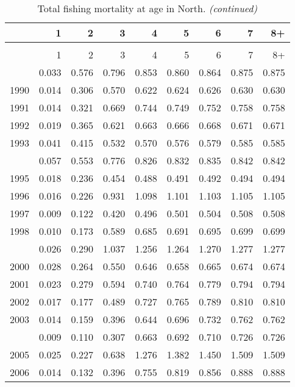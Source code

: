 \documentclass[
]{article}
\begin{document}
\begin{longtable}[t]{lrrrrrrrr}
\caption{\label{tab:North-region-FAA-table}Total fishing mortality at age in North.}\\
\toprule
  & 1 & 2 & 3 & 4 & 5 & 6 & 7 & 8+\\
\midrule
\endfirsthead
\caption[]{Total fishing mortality at age in North. \textit{(continued)}}\\
\toprule
  & 1 & 2 & 3 & 4 & 5 & 6 & 7 & 8+\\
\midrule
\endhead

\endfoot
\bottomrule
\endlastfoot
1989 & 0.033 & 0.576 & 0.796 & 0.853 & 0.860 & 0.864 & 0.875 & 0.875\\
1990 & 0.014 & 0.306 & 0.570 & 0.622 & 0.624 & 0.626 & 0.630 & 0.630\\
1991 & 0.014 & 0.321 & 0.669 & 0.744 & 0.749 & 0.752 & 0.758 & 0.758\\
1992 & 0.019 & 0.365 & 0.621 & 0.663 & 0.666 & 0.668 & 0.671 & 0.671\\
1993 & 0.041 & 0.415 & 0.532 & 0.570 & 0.576 & 0.579 & 0.585 & 0.585\\
\addlinespace
1994 & 0.057 & 0.553 & 0.776 & 0.826 & 0.832 & 0.835 & 0.842 & 0.842\\
1995 & 0.018 & 0.236 & 0.454 & 0.488 & 0.491 & 0.492 & 0.494 & 0.494\\
1996 & 0.016 & 0.226 & 0.931 & 1.098 & 1.101 & 1.103 & 1.105 & 1.105\\
1997 & 0.009 & 0.122 & 0.420 & 0.496 & 0.501 & 0.504 & 0.508 & 0.508\\
1998 & 0.010 & 0.173 & 0.589 & 0.685 & 0.691 & 0.695 & 0.699 & 0.699\\
\addlinespace
1999 & 0.026 & 0.290 & 1.037 & 1.256 & 1.264 & 1.270 & 1.277 & 1.277\\
2000 & 0.028 & 0.264 & 0.550 & 0.646 & 0.658 & 0.665 & 0.674 & 0.674\\
2001 & 0.023 & 0.279 & 0.594 & 0.740 & 0.764 & 0.779 & 0.794 & 0.794\\
2002 & 0.017 & 0.177 & 0.489 & 0.727 & 0.765 & 0.789 & 0.810 & 0.810\\
2003 & 0.014 & 0.159 & 0.396 & 0.644 & 0.696 & 0.732 & 0.762 & 0.762\\
\addlinespace
2004 & 0.009 & 0.110 & 0.307 & 0.663 & 0.692 & 0.710 & 0.726 & 0.726\\
2005 & 0.025 & 0.227 & 0.638 & 1.276 & 1.382 & 1.450 & 1.509 & 1.509\\
2006 & 0.014 & 0.132 & 0.396 & 0.755 & 0.819 & 0.856 & 0.888 & 0.888\\

\end{longtable}
\end{document}
